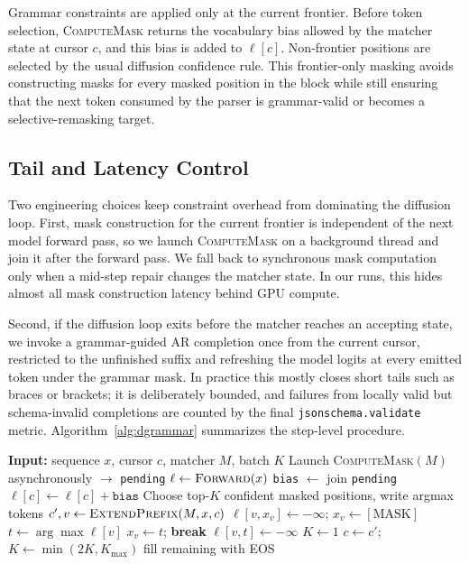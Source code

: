 \documentclass[11pt]{article}
\begin{document}
Grammar constraints are applied only at the current frontier. Before token selection, \textsc{ComputeMask} returns the vocabulary bias allowed by the matcher state at cursor $c$, and this bias is added to $\ell[c]$. Non-frontier positions are selected by the usual diffusion confidence rule. This frontier-only masking avoids constructing masks for every masked position in the block while still ensuring that the next token consumed by the parser is grammar-valid or becomes a selective-remasking target.

\subsection{Tail and Latency Control}

Two engineering choices keep constraint overhead from dominating the diffusion loop. First, mask construction for the current frontier is independent of the next model forward pass, so we launch \textsc{ComputeMask} on a background thread and join it after the forward pass. We fall back to synchronous mask computation only when a mid-step repair changes the matcher state. In our runs, this hides almost all mask construction latency behind GPU compute.

Second, if the diffusion loop exits before the matcher reaches an accepting state, we invoke a grammar-guided AR completion once from the current cursor, restricted to the unfinished suffix and refreshing the model logits at every emitted token under the grammar mask. In practice this mostly closes short tails such as braces or brackets; it is deliberately bounded, and failures from locally valid but schema-invalid completions are counted by the final \texttt{jsonschema.validate} metric. Algorithm~\ref{alg:dgrammar} summarizes the step-level procedure.

\begin{algorithm}[t]
\small
\caption{Dgrammar decoding step}
\label{alg:dgrammar}
\begin{algorithmic}[1]
\State \textbf{Input:} sequence $x$, cursor $c$, matcher $M$, batch $K$
\State Launch \textsc{ComputeMask}$(M)$ asynchronously $\to$ \texttt{pending}
\State $\ell \gets \textsc{Forward}(x)$ 
\State \texttt{bias} $\gets$ join \texttt{pending}
\State $\ell[c] \gets \ell[c] + \texttt{bias}$ 
\State Choose top-$K$ confident masked positions, write argmax tokens
\State $c', v \gets \textsc{ExtendPrefix}(M, x, c)$
 
  \State $\ell[v, x_v] \gets -\infty$; $x_v \gets [\text{MASK}]$
    \State $t \gets \arg\max \ell[v]$
     $x_v \gets t$; \textbf{break} \EndIf
    \State $\ell[v, t] \gets -\infty$
  \EndWhile
  \State $K \gets 1$
\Else
  \State $c \gets c'$; $K \gets \min(2K, K_{\max})$
\EndIf
{} fill remaining with EOS \EndIf
\end{algorithmic}
\end{algorithm}
\end{document}
